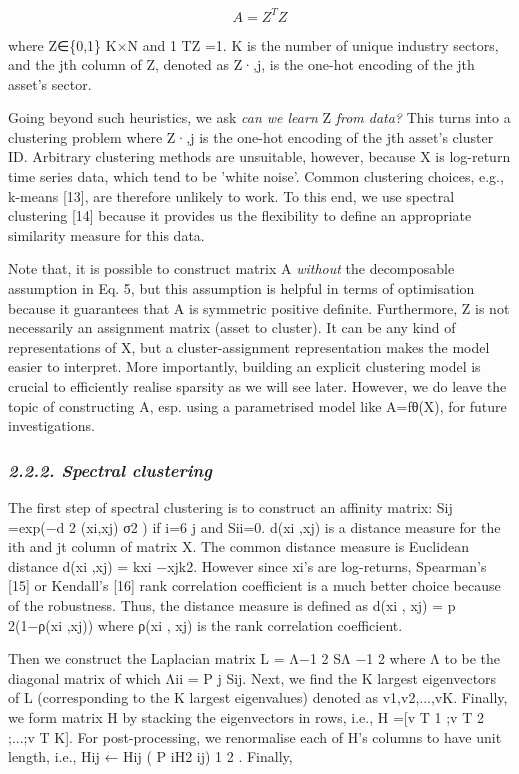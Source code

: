 \documentclass{article}
\begin{document}
$$A=Z^{T}Z\tag{5}$$

where Z∈\{0,1\} K×N and 1 TZ =1. K is the number of unique industry sectors, and the jth column of Z, denoted as Z·,j, is the one-hot encoding of the jth asset's sector.

Going beyond such heuristics, we ask \textit{can we learn} Z \textit{from data?} This turns into a clustering problem where Z·,j is the one-hot encoding of the jth asset's cluster ID. Arbitrary clustering methods are unsuitable, however, because X is log-return time series data, which tend to be 'white noise'. Common clustering choices, e.g., k-means [13], are therefore unlikely to work. To this end, we use spectral clustering [14] because it provides us the flexibility to define an appropriate similarity measure for this data.

Note that, it is possible to construct matrix A \textit{without} the decomposable assumption in Eq. 5, but this assumption is helpful in terms of optimisation because it guarantees that A is symmetric positive definite. Furthermore, Z is not necessarily an assignment matrix (asset to cluster). It can be any kind of representations of X, but a cluster-assignment representation makes the model easier to interpret. More importantly, building an explicit clustering model is crucial to efficiently realise sparsity as we will see later. However, we do leave the topic of constructing A, esp. using a parametrised model like A=fθ(X), for future investigations.

\subsubsection{\textit{2.2.2. Spectral clustering}}

The first step of spectral clustering is to construct an affinity matrix: Sij =exp(−d 2 (xi,xj) σ2 ) if i=6 j and Sii=0. d(xi ,xj) is a distance measure for the ith and jt column of matrix X. The common distance measure is Euclidean distance d(xi ,xj) = kxi −xjk2. However since xi's are log-returns, Spearman's [15] or Kendall's [16] rank correlation coefficient is a much better choice because of the robustness. Thus, the distance measure is defined as d(xi , xj) = p 2(1−ρ(xi ,xj)) where ρ(xi , xj) is the rank correlation coefficient.

Then we construct the Laplacian matrix L = Λ−1 2 SΛ −1 2 where Λ to be the diagonal matrix of which Λii = P j Sij. Next, we find the K largest eigenvectors of L (corresponding to the K largest eigenvalues) denoted as v1,v2,...,vK. Finally, we form matrix H by stacking the eigenvectors in rows, i.e., H =[v T 1 ;v T 2 ;...;v T K]. For post-processing, we renormalise each of H's columns to have unit length, i.e., Hij ← Hij ( P iH2 ij) 1 2 . Finally,
\end{document}

